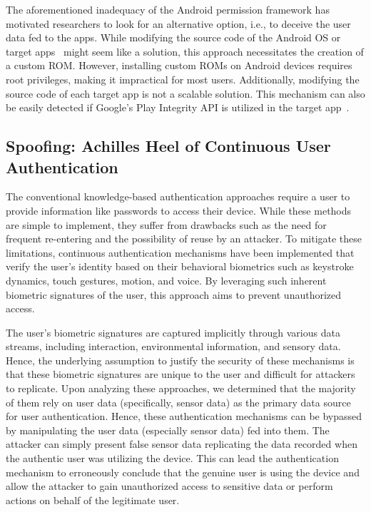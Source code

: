 The aforementioned inadequacy of the Android permission framework has motivated researchers to look for an alternative option, i.e., to deceive the user data fed to the apps. While modifying the source code of the Android OS or target apps~\cite{backes2015boxify, jeon2012dr, raval2016you, smalley2013security, wu2017context} might seem like a solution, this approach necessitates the creation of a custom ROM. However, installing custom ROMs on Android devices requires root privileges, making it impractical for most users. Additionally, modifying the source code of each target app is not a scalable solution. This mechanism can also be easily detected if Google's Play Integrity API is utilized in the target app~\cite{andPlayIntAPI}.

% 

\subsection{Spoofing: Achilles Heel of Continuous User Authentication}
\label{sec:continuous_authentication_mechanisms}

The conventional knowledge-based authentication approaches require a user to provide information like passwords to access their device. While these methods are simple to implement, they suffer from drawbacks such as the need for frequent re-entering and the possibility of reuse by an attacker. To mitigate these limitations, continuous authentication mechanisms have been implemented that verify the user's identity based on their behavioral biometrics such as keystroke dynamics, touch gestures, motion, and voice. By leveraging such inherent biometric signatures of the user, this approach aims to prevent unauthorized access. 

The user's biometric signatures are captured implicitly through various data streams, including interaction, environmental information, and sensory data. Hence, the underlying assumption to justify the security of these mechanisms is that these biometric signatures are unique to the user and difficult for attackers to replicate. Upon analyzing these approaches, we determined that the majority of them rely on user data (specifically, sensor data) as the primary data source for user authentication. Hence, these authentication mechanisms can be bypassed by manipulating the user data (especially sensor data) fed into them. The attacker can simply present false sensor data replicating the data recorded when the authentic user was utilizing the device. This can lead the authentication mechanism to erroneously conclude that the genuine user is using the device and allow the attacker to gain unauthorized access to sensitive data or perform actions on behalf of the legitimate user. 

